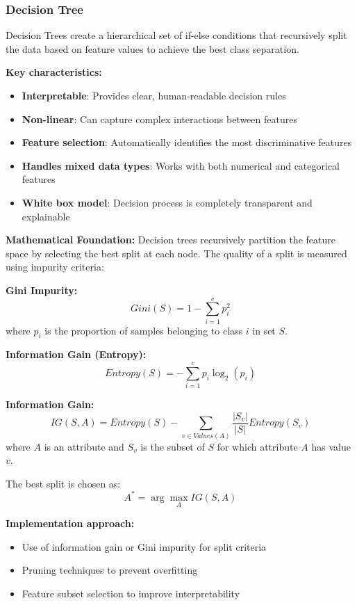 \subsubsection{Decision Tree}
Decision Trees create a hierarchical set of if-else conditions that recursively split the data based on feature values to achieve the best class separation.

\textbf{Key characteristics:}
\begin{itemize}
    \item \textbf{Interpretable}: Provides clear, human-readable decision rules \cite{quinlan1993c4}
    \item \textbf{Non-linear}: Can capture complex interactions between features
    \item \textbf{Feature selection}: Automatically identifies the most discriminative features
    \item \textbf{Handles mixed data types}: Works with both numerical and categorical features
    \item \textbf{White box model}: Decision process is completely transparent and explainable
\end{itemize}

\textbf{Mathematical Foundation:}
Decision trees recursively partition the feature space by selecting the best split at each node. The quality of a split is measured using impurity criteria:

\textbf{Gini Impurity:}
\begin{equation}
Gini(S) = 1 - \sum_{i=1}^{c} p_i^2
\end{equation}
where $p_i$ is the proportion of samples belonging to class $i$ in set $S$.

\textbf{Information Gain (Entropy):}
\begin{equation}
Entropy(S) = -\sum_{i=1}^{c} p_i \log_2(p_i)
\end{equation}

\textbf{Information Gain:}
\begin{equation}
IG(S, A) = Entropy(S) - \sum_{v \in Values(A)} \frac{|S_v|}{|S|} Entropy(S_v)
\end{equation}
where $A$ is an attribute and $S_v$ is the subset of $S$ for which attribute $A$ has value $v$.

The best split is chosen as:
\begin{equation}
A^* = \arg\max_{A} IG(S, A)
\end{equation}

\textbf{Implementation approach:}
\begin{itemize}
    \item Use of information gain or Gini impurity for split criteria
    \item Pruning techniques to prevent overfitting
    \item Feature subset selection to improve interpretability
\end{itemize}

